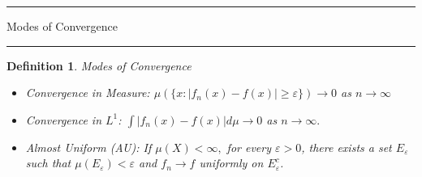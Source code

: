 \documentclass[12pt]{Qual}
\newtheorem{definition}{Definition}
\begin{document}
\begin{center}
\noindent\textcolor{blue!60!black}{\rule{15cm}{1mm}}
\Huge \faBug\faPuzzlePiece\faCoffee Modes of Convergence \faCoffee\faPuzzlePiece\faBug
\vspace{-0.5cm}
\noindent\textcolor{blue!60!black}{\rule{15cm}{1mm}}
\end{center}
\vspace{0.5cm}
\begin{definition}{\Large\textit{Modes of Convergence}}
$\,$

\begin{itemize}
\setlength\itemsep{-0.1em}
\renewcommand\labelitemi{\faCoffee}
    \item Convergence in Measure: $\mu(\{x:|f_n(x)-f(x)|\ge\varepsilon\})\to0$ as $n\to\infty$
    \item Convergence in $L^1$: $\displaystyle\int|f_n(x)-f(x)|d\mu\to0$ as $n\to\infty.$
    \item Almost Uniform (AU): If $\mu(X)<\infty,$ for every $\varepsilon>0$, there exists a set $E_\varepsilon$ such that $\mu(E_\varepsilon)<\varepsilon$ and $f_n\to f$ uniformly on $E_\varepsilon^c$.
\end{itemize}

\end{definition}
\vspace{0.5cm}
\end{document}
